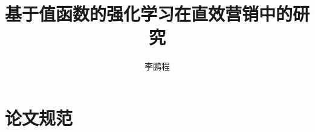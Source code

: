 \documentclass[master]{ustcthesis}
\title{基于值函数的强化学习在直效营销中的研究}
\author{李鹏程}
\begin{document}
\maketitle

%

\frontmatter

\tableofcontents
\listoffigures
\listoftables
\listofalgorithms


\mainmatter
% 



% 
% 

% 
% 

% 
% 
% 


\appendix
\chapter{论文规范}

\backmatter


\end{document}
